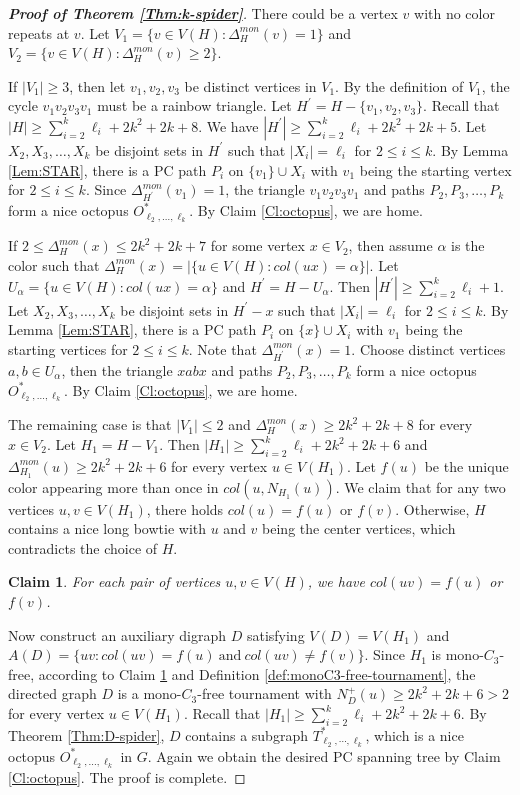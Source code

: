 \documentclass[10pt,a4paper]{amsart}
\newtheorem{claimA}{Claim}
\begin{document}
\begin{proof}[\textbf{Proof of Theorem \ref{Thm:k-spider}}]
There could be a vertex $v$ with no color repeats at $v$. Let $V_1=\{v\in V(H): \Delta^{mon}_H(v)=1\}$ and $V_2=\{v\in V(H): \Delta^{mon}_H(v)\geq 2\}$.

If $|V_1|\geq 3$, then let $v_1,v_2,v_3$ be distinct vertices in $V_1$. By the definition of $V_1$, the cycle $v_1v_2v_3v_1$ must be a rainbow triangle. Let $H^\prime=H-\{v_1,v_2,v_3\}$. Recall that $|H|\geq \sum_{i=2}^k\ell_i+2k^2+2k+8$. We have $|H^\prime|\geq \sum_{i=2}^k\ell_i+2k^2+2k+5$. Let $X_2, X_3,\ldots, X_k$ be disjoint sets in $H^\prime$ such that $|X_i|=\ell_i$ for $2\leq i\leq k$. By Lemma \ref{Lem:STAR}, there is a PC path $P_i$ on $\{v_1\}\cup X_i$ with $v_1$ being the starting vertex for $2\leq i\leq k$. Since $\Delta^{mon}_{H^\prime}(v_1)=1$, the triangle $v_1v_2v_3v_1$ and paths $P_2,P_3,\ldots,P_k$ form a nice octopus $O^*_{ \ell_2, \ldots, \ell_k}$. By Claim \ref{Cl:octopus}, we are home.

If $2\leq \Delta^{mon}_{H}(x)\leq 2k^2+2k+7$ for some vertex $x\in V_2$, then assume $\alpha$ is the color such that $\Delta^{mon}_{H}(x) = |\{u\in V(H): col(ux) = \alpha\}|$.  Let $U_\alpha=\{u\in V(H): col(ux) = \alpha\}$ and $H^\prime=H-U_\alpha$. Then $|H^\prime|\geq \sum_{i=2}^k\ell_i+1$. Let $X_2, X_3,\ldots, X_k$ be disjoint sets in $H^\prime-x$ such that $|X_i|=\ell_i$ for $2\leq i\leq k$. By Lemma \ref{Lem:STAR}, there is a PC path $P_i$ on $\{x\}\cup X_i$ with $v_1$ being the starting vertices for $2\leq i\leq k$. Note that $\Delta^{mon}_{H^\prime}(x)=1$. Choose distinct vertices $a,b\in U_\alpha$, then the triangle $xabx$ and paths $P_2,P_3,\ldots,P_k$ form a nice octopus $O^*_{ \ell_2, \ldots, \ell_k}$. By Claim \ref{Cl:octopus}, we are home.

The remaining case is that $|V_1|\leq 2$ and $\Delta^{mon}_{H}(x)\geq 2k^2+2k+8$ for every $x\in V_2$. Let $H_1=H-V_1$.
Then $|H_1|\geq \sum_{i=2}^k\ell_i+2k^2+2k+6$ and $\Delta^{mon}_{H_1}(u)\geq 2k^2+2k+6$ for every vertex $u\in V(H_1)$. Let $f(u)$ be the unique color appearing more than once in $col(u,N_{H_1}(u))$. We claim that for any two vertices $u, v\in V(H_1)$,  there holds $col(u)=f(u)$ or $f(v)$. Otherwise, $H$ contains a nice long bowtie with $u$ and $v$ being the center vertices, which contradicts the choice of $H$.
\begin{claimA}\label{Cl:degenerate}
For each pair of vertices $u,v\in V(H)$, we have $col(uv)=f(u)$ or $f(v)$.
\end{claimA}
Now construct an auxiliary digraph $D$ satisfying $V(D)=V(H_1)$ and $A(D)=\{uv: col(uv)=f(u) \ \text{and}\  col(uv)\ne f(v) \}.$ Since $H_1$ is mono-$C_3$-free, according to Claim \ref{Cl:degenerate} and Definition \ref{def:monoC3-free-tournament}, the directed graph $D$ is a mono-$C_3$-free tournament with $N^+_{D}(u)\geq 2k^2+2k+6>2$ for every vertex $u\in V(H_1)$. Recall that $|H_1|\geq \sum_{i=2}^k\ell_i+2k^2+2k+6$.
By Theorem \ref{Thm:D-spider}, $D$ contains a subgraph $ T^*_{\ell_2, \cdots, \ell_k}$, which is a nice octopus $O^*_{ \ell_2,\ldots,\ell_k}$ in $G$. Again we obtain the desired PC spanning tree by Claim \ref{Cl:octopus}. The proof is complete.
\end{proof}
\end{document}
